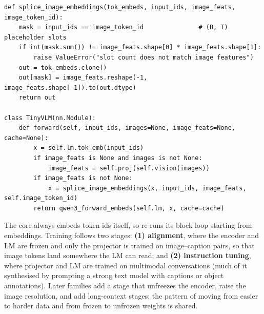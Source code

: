 \begin{lstlisting}[caption={Splicing image features into the token sequence and running a core Qwen3 decoder from embeddings (\code{llmsys/vlm.py}).},label={lst:align:splice}]
def splice_image_embeddings(tok_embeds, input_ids, image_feats, image_token_id):
    mask = input_ids == image_token_id               # (B, T) placeholder slots
    if int(mask.sum()) != image_feats.shape[0] * image_feats.shape[1]:
        raise ValueError("slot count does not match image features")
    out = tok_embeds.clone()
    out[mask] = image_feats.reshape(-1, image_feats.shape[-1]).to(out.dtype)
    return out

class TinyVLM(nn.Module):
    def forward(self, input_ids, images=None, image_feats=None, cache=None):
        x = self.lm.tok_emb(input_ids)
        if image_feats is None and images is not None:
            image_feats = self.proj(self.vision(images))
        if image_feats is not None:
            x = splice_image_embeddings(x, input_ids, image_feats, self.image_token_id)
        return qwen3_forward_embeds(self.lm, x, cache=cache)
\end{lstlisting}

The core  always embeds token ids itself, so 
re-runs its block loop starting from embeddings. Training follows two stages:
\textbf{(1) alignment}, where the encoder and LM are frozen and only the projector is trained on
image--caption pairs, so that image tokens land somewhere the LM can read; and \textbf{(2)
instruction tuning}, where projector and LM are trained on multimodal conversations (much of it
synthesised by prompting a strong text model with captions or object annotations). Later
families add a stage that unfreezes the encoder, raise the image resolution, and add long-context
stages; the pattern of moving from easier to harder data and from frozen to unfrozen weights is shared.

